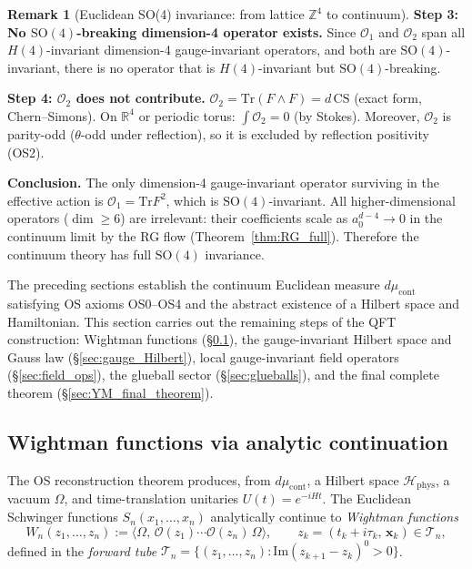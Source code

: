 \documentclass[11pt,a4paper]{amsart}
\theoremstyle{definition}
\newtheorem{remark}[theorem]{Remark}
\newcommand{\Z}{\mathbb{Z}}
\newcommand{\R}{\mathbb{R}}
\newcommand{\Tr}{\mathrm{Tr}}
\begin{document}
\begin{remark}[Euclidean SO(4) invariance: from lattice $\Z^4$ to continuum]
\textbf{Step 3: No $\mathrm{SO}(4)$-breaking dimension-4 operator exists.}
Since $\mathcal{O}_1$ and $\mathcal{O}_2$ span all $H(4)$-invariant
dimension-4 gauge-invariant operators, and both are $\mathrm{SO}(4)$-invariant,
there is no operator that is $H(4)$-invariant but $\mathrm{SO}(4)$-breaking.

\textbf{Step 4: $\mathcal{O}_2$ does not contribute.}
$\mathcal{O}_2 = \Tr(F\wedge F) = d\,\mathrm{CS}$ (exact form, Chern--Simons).
On $\R^4$ or periodic torus: $\int\mathcal{O}_2 = 0$ (by Stokes).
Moreover, $\mathcal{O}_2$ is parity-odd ($\theta$-odd under reflection),
so it is excluded by reflection positivity (OS2).

\textbf{Conclusion.}
The only dimension-4 gauge-invariant operator surviving in the effective action
is $\mathcal{O}_1 = \Tr F^2$, which is $\mathrm{SO}(4)$-invariant.
All higher-dimensional operators ($\dim \ge 6$) are irrelevant: their coefficients
scale as $a_0^{d-4} \to 0$ in the continuum limit by the RG flow
(Theorem~\ref{thm:RG_full}).  Therefore the continuum theory has full
$\mathrm{SO}(4)$ invariance.
\end{remark}

The preceding sections establish the continuum Euclidean measure
$d\mu_{\mathrm{cont}}$ satisfying OS axioms OS0--OS4 and the abstract
existence of a Hilbert space and Hamiltonian.  This section carries out the
remaining steps of the QFT construction: Wightman functions (§\ref{sec:Wightman}),
the gauge-invariant Hilbert space and Gauss law (§\ref{sec:gauge_Hilbert}),
local gauge-invariant field operators (§\ref{sec:field_ops}),
the glueball sector (§\ref{sec:glueballs}),
and the final complete theorem
(§\ref{sec:YM_final_theorem}).

\subsection{Wightman functions via analytic continuation}
\label{sec:Wightman}

The OS reconstruction theorem \cite[Thm.~3.3]{OS75} produces, from
$d\mu_{\mathrm{cont}}$, a Hilbert space $\mathcal{H}_{\mathrm{phys}}$,
a vacuum $\Omega$, and time-translation unitaries $U(t) = e^{-iHt}$.
The Euclidean Schwinger functions $S_n(x_1,\ldots,x_n)$ analytically
continue to \emph{Wightman functions}
\begin{equation}
\label{eq:Wightman_def}
  W_n(z_1,\ldots,z_n)
  := \langle\Omega,\,\mathcal{O}(z_1)\cdots\mathcal{O}(z_n)\,\Omega\rangle,
  \qquad z_k = (t_k + i\tau_k,\,\mathbf{x}_k) \in \mathcal{T}_n,
\end{equation}
defined in the \emph{forward tube} $\mathcal{T}_n = \{(z_1,\ldots,z_n):
\mathrm{Im}(z_{k+1}-z_k)^0 > 0\}$.
\end{document}
